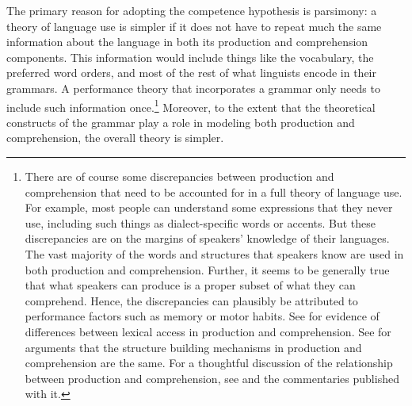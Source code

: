 \documentclass[a4paper]{article}
\begin{document}
The primary reason for adopting the competence hypothesis is parsimony:  a theory of language use is simpler if it does not have to repeat much the same information about the language in both its production and comprehension components.  This information would include things like the vocabulary, the preferred word orders, and most of the rest of what linguists encode in their grammars.  A performance theory that incorporates a grammar only needs to include such information once.\footnote{There are of course some discrepancies between production and comprehension that need to be accounted for in a full theory of language use.  For example, most people can understand some expressions that they never use, including such things as dialect-specific words or accents.  But these discrepancies are on the margins of speakers' knowledge of their languages.  The vast majority of the words and structures that speakers know are used in both production and comprehension.  Further, it seems to be generally true that what speakers can produce is a proper subset of what they can comprehend.  Hence, the discrepancies can plausibly be attributed to performance factors such as memory or motor habits.  See \citet{GollanEtal2011} for evidence of differences between lexical access in production and comprehension.  See \citet{MommaPhillips2018} for arguments that the structure building mechanisms in production and comprehension are the same.  For a thoughtful discussion of the relationship between production and comprehension, see \citet{MacDonald2013} and the commentaries published with it.}  Moreover, to the extent that the theoretical constructs of the grammar play a role in modeling both production and comprehension, the overall theory is simpler.
\end{document}
